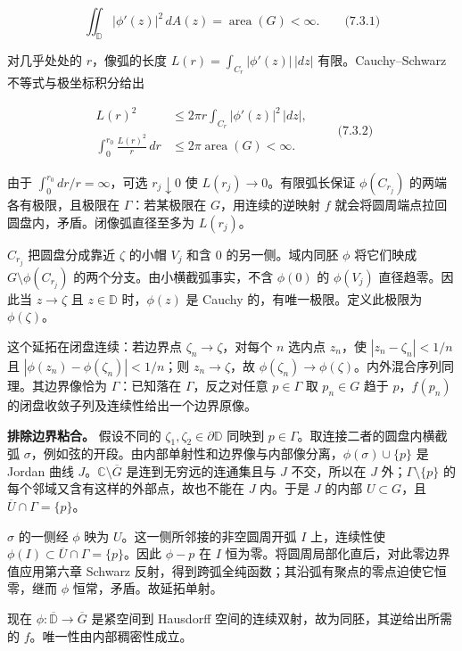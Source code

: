 \documentclass[11pt,a4paper]{article}
\begin{document}
\[
\iint_{\mathbb D}|\phi'(z)|^2\,dA(z)=\operatorname{area}(G)<\infty.
\qquad\text{(7.3.1)}
\]

对几乎处处的 \(r\)，像弧的长度 \(L(r)=\int_{C_r}|\phi'(z)|\,|dz|\)
有限。Cauchy--Schwarz 不等式与极坐标积分给出

\[
\begin{aligned}
L(r)^2&\le2\pi r\int_{C_r}|\phi'(z)|^2\,|dz|,\\
\int_0^{r_0}\frac{L(r)^2}{r}\,dr&\le2\pi\operatorname{area}(G)<\infty.
\end{aligned}\qquad\text{(7.3.2)}
\]

由于 \(\int_0^{r_0}dr/r=\infty\)，可选 \(r_j\downarrow0\) 使
\(L(r_j)\to0\)。有限弧长保证 \(\phi(C_{r_j})\) 的两端各有极限，且极限在
\(\Gamma\)：若某极限在 \(G\)，用连续的逆映射 \(f\)
就会将圆周端点拉回圆盘内，矛盾。闭像弧直径至多为 \(L(r_j)\)。

\(C_{r_j}\) 把圆盘分成靠近 \(\zeta\) 的小帽 \(V_j\) 和含 \(0\)
的另一侧。域内同胚 \(\phi\) 将它们映成 \(G\setminus\phi(C_{r_j})\)
的两个分支。由小横截弧事实，不含 \(\phi(0)\) 的 \(\phi(V_j)\)
直径趋零。因此当 \(z\to\zeta\) 且 \(z\in\mathbb D\) 时，\(\phi(z)\) 是
Cauchy 的，有唯一极限。定义此极限为 \(\phi(\zeta)\)。

这个延拓在闭盘连续：若边界点 \(\zeta_n\to\zeta\)，对每个 \(n\) 选内点
\(z_n\)，使 \(|z_n-\zeta_n|<1/n\) 且
\(|\phi(z_n)-\phi(\zeta_n)|<1/n\)；则 \(z_n\to\zeta\)，故
\(\phi(\zeta_n)\to\phi(\zeta)\)。内外混合序列同理。其边界像恰为
\(\Gamma\)：已知落在 \(\Gamma\)，反之对任意 \(p\in\Gamma\) 取
\(p_n\in G\) 趋于 \(p\)，\(f(p_n)\)
的闭盘收敛子列及连续性给出一个边界原像。

\textbf{排除边界粘合。} 假设不同的
\(\zeta_1,\zeta_2\in\partial\mathbb D\) 同映到
\(p\in\Gamma\)。取连接二者的圆盘内横截弧
\(\sigma\)，例如弦的开段。由内部单射性和边界像与内部像分离，\(\phi(\sigma)\cup\{p\}\)
是 Jordan 曲线 \(J\)。\(\mathbb C\setminus\overline G\)
是连到无穷远的连通集且与 \(J\) 不交，所以在 \(J\)
外；\(\Gamma\setminus\{p\}\) 的每个邻域又含有这样的外部点，故也不能在
\(J\) 内。于是 \(J\) 的内部 \(U\subset G\)，且
\(\overline U\cap\Gamma=\{p\}\)。

\(\sigma\) 的一侧经 \(\phi\) 映为 \(U\)。这一侧所邻接的非空圆周开弧
\(I\) 上，连续性使 \(\phi(I)\subset\overline U\cap\Gamma=\{p\}\)。因此
\(\phi-p\) 在 \(I\) 恒为零。将圆周局部化直后，对此零边界值应用第六章
Schwarz 反射，得到跨弧全纯函数；其沿弧有聚点的零点迫使它恒零，继而
\(\phi\) 恒常，矛盾。故延拓单射。

现在 \(\phi:\overline{\mathbb D}\to\overline G\) 是紧空间到 Hausdorff
空间的连续双射，故为同胚，其逆给出所需的 \(f\)。唯一性由内部稠密性成立。
\end{document}
